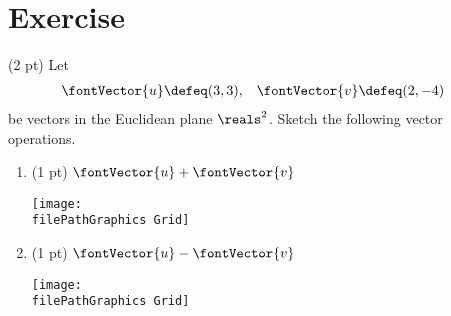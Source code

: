 \section{Exercise}

(2 pt) Let
\begin{align*}
\fontVector{u}
&\defeq
(3,3),
&
\fontVector{v}
&\defeq
(2,-4)
\end{align*}
be vectors in the Euclidean plane $\reals^{2}$. Sketch the following vector operations.
\begin{multicols}{2}
\begin{enumerate}[label=(\alph*)]
\item (1 pt) $\fontVector{u} + \fontVector{v}$

\texttt{[image: \\filePathGraphics Grid]}

\item (1 pt) $\fontVector{u} - \fontVector{v}$

\texttt{[image: \\filePathGraphics Grid]}
\end{enumerate}
\end{multicols}